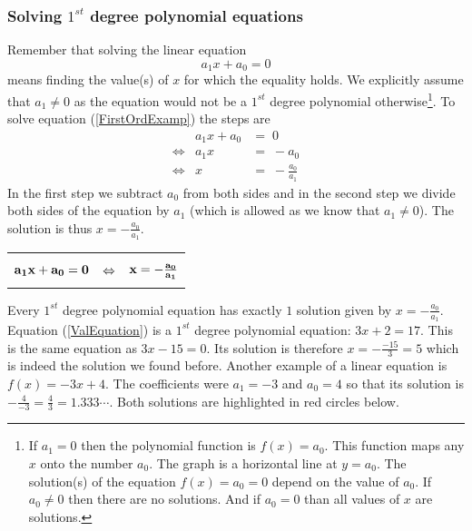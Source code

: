 \subsubsection{Solving $1^{st}$ degree polynomial equations}

\noindent Remember that solving the linear equation
\begin{equation}
a_1 x + a_0 = 0
\label{FirstOrdExamp}
\end{equation}
means finding the value(s) of $x$ for which the equality holds. We explicitly assume that $a_1 \neq 0$ as the equation would not be a $1^{st}$ degree polynomial otherwise\footnote{If $a_1=0$ then the polynomial function is $f(x)= a_0$. This function maps any $x$ onto the number $a_0$. The graph is a horizontal line at $y=a_0$. The solution(s) of the equation $f(x) = a_0 = 0$ depend on the value of $a_0$. If $a_0 \neq 0$ then there are no solutions. And if $a_0=0$ than all values of $x$ are solutions.}. To solve equation (\ref{FirstOrdExamp}) the steps are
\begin{eqnarray*}
 & a_1 x + a_0  & = \;0 \\
 \Leftrightarrow & a_1 x &  = \;  - a_0 \\
  \Leftrightarrow & x  & =  \;- \frac{a_0}{a_1}
\end{eqnarray*}
\noindent In the first step we subtract $a_0$ from both sides and in the second step we divide both sides of the equation by $a_1$ (which is allowed as we know that $a_1 \neq 0$). The solution is thus $x = -\frac{a_0}{a_1}$.
\begin{center}

\begin{tabular}{ |ccc| }
  \hline
	& & \\
  $\bf{a_1 x + a_0 = 0}$ & $\bf{\Leftrightarrow}$ & $\bf{x =  - \frac{a_0}{a_1}}$ \\
  & & \\
	\hline
	\end{tabular}
\end{center}
\noindent Every $1^{st}$ degree polynomial equation has exactly $1$ solution given by $x = -\frac{a_0}{a_1}$. Equation (\ref{ValEquation}) is a $1^{st}$ degree polynomial equation: $3x + 2 = 17$. This is the same equation as $3x -15 = 0$. Its solution is therefore $x= - \frac{-15}{3} = 5$ which is indeed the solution we found before. Another example of a linear equation is $f(x)=-3x + 4$. The coefficients were $a_1 = -3$ and $a_0 = 4$ so that its solution is $-\frac{4}{-3} = \frac{4}{3} = 1.333\cdots$. Both solutions are highlighted in red circles below.
